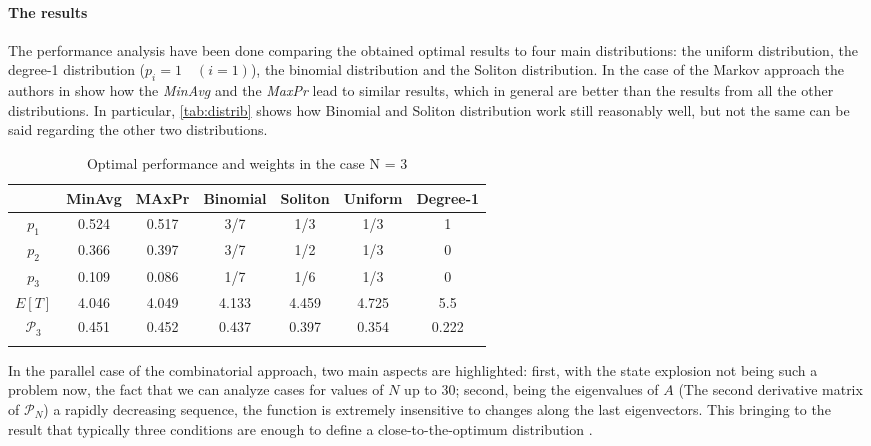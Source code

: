\paragraph{The results}
The performance analysis have been done comparing the obtained optimal results to four main distributions: the uniform distribution, the degree-1 distribution ($p_i = 1 \quad (i=1)$), the binomial distribution and the Soliton distribution. In the case of the Markov approach the authors in \cite{Byers} show how the \textit{MinAvg} and the \textit{MaxPr} lead to similar results, which in general are better than the results from all the other distributions. In particular, \autoref{tab:distrib} shows how Binomial and Soliton distribution work still reasonably well, but not the same can be said regarding the other two distributions.
\begin{table}
\centering
\begin{tabular}{ccccccc}
\firsthline
& MinAvg & MAxPr & Binomial & Soliton & Uniform & Degree-1\\
\hline
$p_1$ & 0.524 & 0.517 & 3/7 & 1/3 & 1/3 & 1\\
$p_2$ & 0.366 & 0.397 & 3/7 & 1/2 & 1/3 & 0\\
$p_3$ & 0.109 & 0.086 &  1/7 & 1/6 & 1/3 & 0\\
\hline
$E[T]$ & 4.046 & 4.049 & 4.133 & 4.459 & 4.725 & 5.5\\
$\mathcal{P}_3$ & 0.451 & 0.452 & 0.437 & 0.397 & 0.354 & 0.222\\
\lasthline
\end{tabular}
  \caption{Optimal performance and weights in the case N = 3}
  \label{tab:distrib}
\end{table}
In the parallel case of the combinatorial approach, two main aspects are highlighted: first, with the state explosion not being such a problem now, the fact that we can analyze cases for values of $N$ up to $30$; second, being the eigenvalues of $A$ (The second derivative matrix of $\mathcal{P}_N$) a rapidly decreasing sequence, the function is extremely insensitive to changes along the last eigenvectors. This bringing to the result that typically three conditions are enough to define a close-to-the-optimum distribution \cite{Hyytia2007}.
